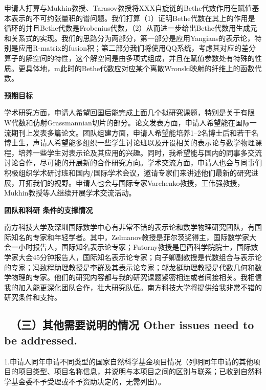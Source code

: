 \documentclass[12pt,UTF8,AutoFakeBold=4,a4paper]{ctexart}
\begin{document}
申请人打算与Mukhin教授、Tarasov教授将XXX自旋链的Bethe代数作用在赋值基本表示的不可约张量积的谱问题。我们打算（1）证明Bethe代数在其上的作用是循环的并且Bethe代数是Frobenius代数，（2）从而进一步给出Bethe代数用生成元和关系式的实现。我们的思路分为两部分，第一部分是应用Yangians的表示论，特别是应用R-matrix的fusion积；第二部分我们将使用QQ系统，考虑其对应的差分算子的解空间的特性，这个解空间是由多项式组成，并且在赋值参数处有特殊的性质。更具体地，m此时的Bethe代数应对应某个离散Wronski映射的纤维上的函数代数。

\medskip

\textbf{\sihao 预期目标}

学术研究方面，申请人希望回国后能完成上面几个拟研究课题，特别是关于有限W代数和仿射Grassmannian切片的部分。论文发表方面，申请人希望能在国际一流期刊上发表多篇论文。团队组建方面，申请人希望能培养1--2名博士后和若干名博士生，声请人希望能多组织一些学生讨论班以及开设相关的表示论与数学物理课程，培养一些学生对表示论及其应用的兴趣。同时，我希望能与国内的同事多交流讨论合作，尽可能的开展新的合作研究方向。学术交流方面，申请人也会与同事们积极组织学术研讨班和国内/国际学术会议，邀请专家们来讲述他们最新的研究进展，开拓我们的视野。申请人也会与国际专家Varchenko教授，王伟强教授，Mukhin教授等人继续开展学术交流活动。

\medskip

\textbf{\sihao 团队和科研 条件的支撑情况}

南方科技大学及深圳国际数学中心有非常不错的表示论和数学物理研究团队，有国际知名的专家和年轻学者。其中，Zelmanov教授是菲尔茨奖得主，国际数学家大会一小时报告人，国际知名表示论专家；Futorny教授是巴西科学院院士，国际数学家大会45分钟报告人，国际知名表示论专家；向子卿副教授是代数组合与表示论的专家；冯致程助理教授是李群及其表示论专家；邬龙挺助理教授是代数几何和数学物理的专家。他们的研究内容都与我的研究课题紧密相连或者间接相关。我相信我的加入能更深化团队合作，壮大研究队伍。南方科技大学将提供给我非常不错的研究条件和支持。

\bigskip

{\color{MsBlue} \subsection{\sihao \kaishu \qquad \ \bfseries（三）其他需要说明的情况 
\xiaosihao {} Other issues need to be addressed.}}
%

\bigskip

{\sihao \color{MsBlue} \kaishu 1.申请人同年申请不同类型的国家自然科学基金项目情况（列明同年申请的其他项目的项目类型、项目名称信息，并说明与本项目之间的区别与联系；已收到自然科学基金委不予受理或不予资助决定的，无需列出）。}
\end{document}

